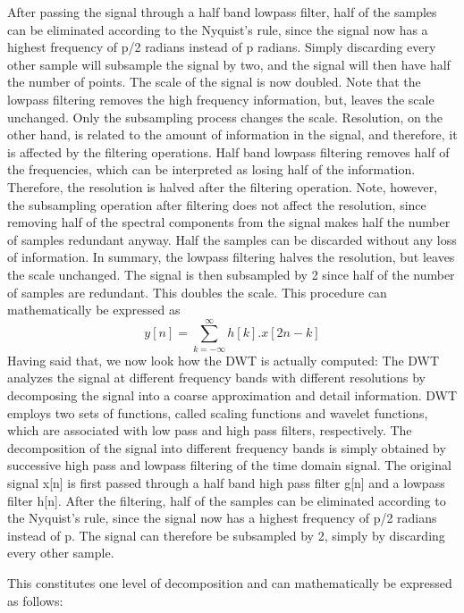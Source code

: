 \documentclass[12pt, a4paper, twoside]{report}
\begin{document}
\par
After passing the signal through a half band lowpass filter, half of the samples can be eliminated according to the Nyquist’s rule, since the signal now has a highest frequency of p/2 radians instead of p radians. Simply discarding every other sample will subsample the signal by two, and the signal will then have half the number of points. The scale of the signal is now doubled. Note that the lowpass filtering removes the high frequency information, but, leaves the scale unchanged. Only the subsampling process changes the scale. Resolution, on the other hand, is related to the amount of information in the signal, and therefore, it is affected by the filtering operations. Half band lowpass filtering removes half of the frequencies, which can be interpreted as losing half of the information. Therefore, the resolution is halved after the filtering operation. Note, however, the subsampling operation after filtering does not affect the resolution, since removing half of the spectral components from the signal makes half the number of samples redundant anyway. Half the samples can be discarded without any loss of information. In summary, the lowpass filtering halves the resolution, but leaves the scale unchanged. The signal is then subsampled by 2 since half of the number of samples are redundant. This doubles the scale. This procedure can mathematically be expressed as
\begin{equation}
y[n] = \sum_{k=-\infty}^{\infty} h[k].x[2n-k]
\end{equation}
Having said that, we now look how the DWT is actually computed: The DWT analyzes the signal at different frequency bands with different resolutions by decomposing the signal into a coarse approximation and detail information. DWT employs two sets of functions, called scaling functions and wavelet functions, which are associated with low pass and high pass filters, respectively. The decomposition of the signal into different frequency bands is simply obtained by successive high pass and lowpass filtering of the time domain signal. The original signal x[n] is first passed through a half band high pass filter g[n] and a lowpass filter h[n]. After the filtering, half of the samples can be eliminated according to the Nyquist’s rule, since the signal now has a highest frequency of p/2 radians instead of p. The signal can therefore be subsampled by 2, simply by discarding every other sample.
\par
This constitutes one level of decomposition and can mathematically be expressed as follows:
\end{document}
